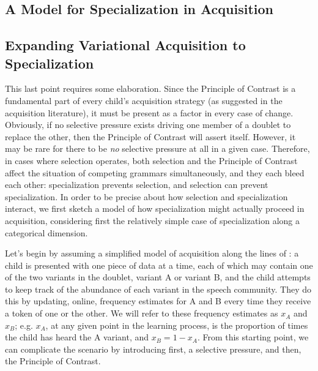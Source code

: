 \subsection{A Model for Specialization in Acquisition}
\label{catspec}

\subsection{Expanding Variational Acquisition to Specialization}
\label{varExpand}

This last point requires some elaboration.
Since the Principle of Contrast is a fundamental part of every child's acquisition strategy (as suggested in the acquisition literature), it must be present as a factor in every case of change.
Obviously, if no selective pressure exists driving one member of a doublet to replace the other, then the Principle of Contrast will assert itself.
However, it may be rare for there to be \textsl{no} selective pressure at all in a given case.
Therefore, in cases where selection operates, both selection and the Principle of Contrast affect the situation of competing grammars simultaneously, and they each bleed each other: specialization prevents selection, and selection can prevent specialization.
In order to be precise about how selection and specialization interact, we first sketch a model of how specialization might actually proceed in acquisition, considering first the relatively simple case of specialization along a categorical dimension.

Let's begin by assuming a simplified model of acquisition along the lines of \citet{yang2000,yang2002}: a child is presented with one piece of data at a time, each of which may contain one of the two variants in the doublet, variant A or variant B, and the child attempts to keep track of the abundance of each variant in the speech community.
They do this by updating, online, frequency estimates for A and B every time they receive a token of one or the other.
We will refer to these frequency estimates as $x_A$ and $x_B$; e.g. $x_A$, at any given point in the learning process, is the proportion of times the child has heard the A variant, and $x_B = 1-x_A$.
From this starting point, we can complicate the scenario by introducing first, a selective pressure, and then, the Principle of Contrast.

